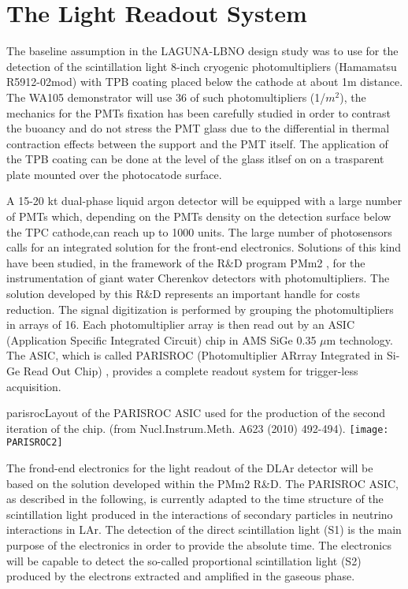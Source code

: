 \section{The Light Readout System} 
\label{sec:detectors-fd-alt-light}

The baseline assumption in the LAGUNA-LBNO design study was to use for the detection of the scintillation light 8-inch cryogenic photomultipliers (Hamamatsu R5912-02mod) with TPB coating placed below the cathode at about 1m distance. The WA105 demonstrator will use 36 of such photomultipliers (1/$m^2$), the mechanics for the PMTs fixation has been carefully studied in order to contrast the buoancy and do not stress the PMT glass due to the differential in thermal contraction effects between the support and the PMT itself. The application of the TPB coating can be done at the level of the glass itlsef on on a trasparent plate mounted over the photocatode surface.

A 15-20 kt dual-phase liquid argon detector will be equipped with a large number of PMTs which, depending on the PMTs density on the detection surface below the TPC cathode,can reach up to 1000 units. The large number of photosensors calls for an integrated solution for the front-end electronics.
Solutions of this kind have been studied, in the framework of the R\&D program PMm2 \cite{PMM2-1, PMM2-2}, for the instrumentation of giant water
Cherenkov detectors with photomultipliers. The solution developed by this R\&D represents an
important handle for costs reduction. The signal digitization is performed by grouping the
photomultipliers in arrays of 16. Each photomultiplier array is then read out by an ASIC
(Application Specific Integrated Circuit) chip in AMS SiGe 0.35 $\mu$m technology. The ASIC,
which is called PARISROC (Photomultiplier ARrray Integrated in Si-Ge Read Out Chip) 
\cite{Parisroc}, provides a complete readout system for trigger-less acquisition.

\begin{cdrfigure}{parisroc}{Layout of the PARISROC ASIC used for the production of the second iteration of the
chip. (from Nucl.Instrum.Meth. A623 (2010) 492-494).}
 \texttt{[image: PARISROC2]}  
\end{cdrfigure}

The frond-end electronics for the light readout of the DLAr detector will be based on the solution 
developed within the PMm2 R\&D. The PARISROC ASIC, as described in the following, is currently adapted to the 
time structure of the scintillation light produced in the interactions of secondary particles in neutrino interactions in LAr. 
The detection of the direct scintillation light (S1) is the main purpose of the electronics in order to provide the absolute time.
The electronics will be capable to detect the so-called proportional scintillation light (S2) produced by the electrons extracted and amplified in the gaseous phase.

